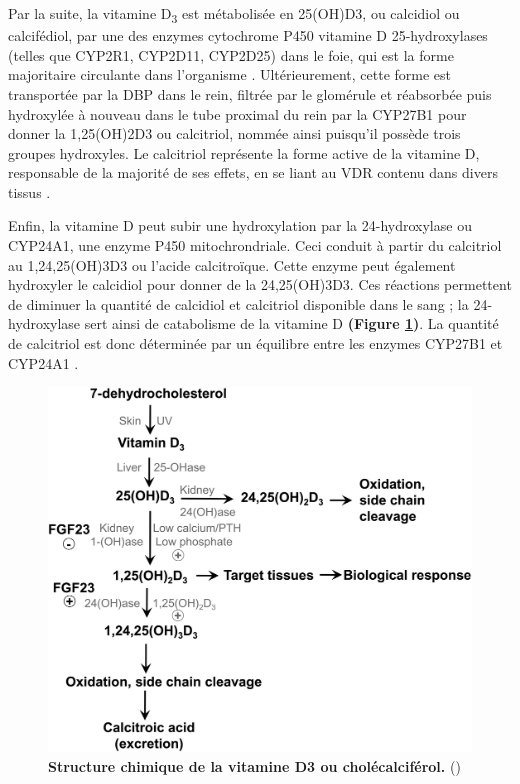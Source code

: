 \documentclass[
  a4paper,
  DIV=11,
  numbers=noendperiod,
  listof=totoc]{scrreprt}
\begin{document}
Par la suite, la vitamine D\textsubscript{3} est métabolisée en
\ac{25(OH)D3}, ou calcidiol ou calcifédiol, par une des enzymes
cytochrome P450 vitamine D 25-hydroxylases (telles que CYP2R1, CYP2D11,
CYP2D25) dans le foie, qui est la forme majoritaire circulante dans
l'organisme \autocite{Norman.2008,Christakos.2010}. Ultérieurement,
cette forme est transportée par la \ac{DBP} dans le rein, filtrée par le
glomérule et réabsorbée puis hydroxylée à nouveau dans le tube proximal
du rein par la \ac{CYP27B1} pour donner la \ac{1,25(OH)2D3} ou
calcitriol, nommée ainsi puisqu'il possède trois groupes hydroxyles. Le
calcitriol représente la forme active de la vitamine D, responsable de
la majorité de ses effets, en se liant au \ac{VDR} contenu dans divers
tissus \autocite{Norman.2008,Dankers.2017}.

Enfin, la vitamine D peut subir une hydroxylation par la 24-hydroxylase
ou \acs{CYP24A1}, une enzyme P450 mitochrondriale. Ceci conduit à partir
du calcitriol au \acs{1,24,25(OH)3D3} ou l'acide calcitroïque. Cette
enzyme peut également hydroxyler le calcidiol pour donner de la
\ac{24,25(OH)3D3}. Ces réactions permettent de diminuer la quantité de
calcidiol et calcitriol disponible dans le sang ; la 24-hydroxylase sert
ainsi de catabolisme de la vitamine D \autocite{Norman.2008}
\textbf{(Figure \ref{fig:metabolism-vitd})}. La quantité de calcitriol
est donc déterminée par un équilibre entre les enzymes \ac{CYP27B1} et
\ac{CYP24A1} \autocite{Dankers.2017}.

\begin{figure}
\centering
\includegraphics{figures/vitamin-d-metabolism.png} 
\caption[\textbf{Métabolisme de la vitamine D.}]{\textbf{Structure chimique de la vitamine D3 ou cholécalciférol.} (\cite{Norman.2008})}
\label{fig:metabolism-vitd}
\end{figure}
\end{document}
